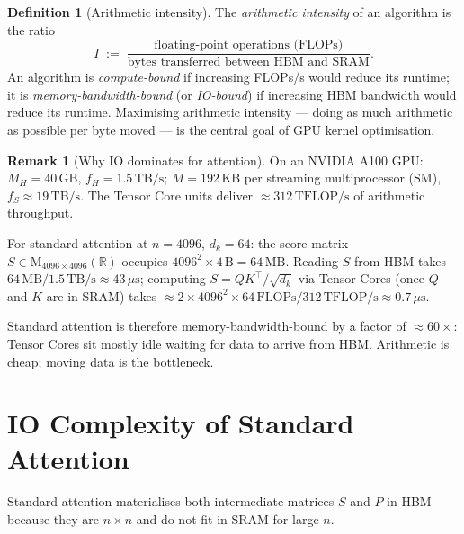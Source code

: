 \documentclass[11pt]{amsart}
\theoremstyle{plain}
\theoremstyle{definition}
\newtheorem{definition}[theorem]{Definition}
\newtheorem{remark}[theorem]{Remark}
\newcommand{\R}{\mathbb{R}}
\newcommand{\Mat}[2]{\mathrm{M}_{#1 \times #2}(\R)}
\begin{document}
\begin{definition}[Arithmetic intensity]
\label{def:arithmetic-intensity}
The \emph{arithmetic intensity} of an algorithm is the ratio
\[
    I \;:=\; \frac{\text{floating-point operations (FLOPs)}}{\text{bytes transferred between HBM and SRAM}}.
\]
An algorithm is \emph{compute-bound} if increasing FLOPs/s would reduce
its runtime; it is \emph{memory-bandwidth-bound} (or \emph{IO-bound}) if
increasing HBM bandwidth would reduce its runtime.  Maximising arithmetic
intensity --- doing as much arithmetic as possible per byte moved --- is
the central goal of GPU kernel optimisation.
\end{definition}

\begin{remark}[Why IO dominates for attention]
\label{rem:io-dominates}
On an NVIDIA A100 GPU: $M_H = 40\,\text{GB}$, $f_H = 1.5\,\text{TB/s}$;
$M = 192\,\text{KB}$ per streaming multiprocessor (SM),
$f_S \approx 19\,\text{TB/s}$.
The Tensor Core units deliver $\approx 312\,\text{TFLOP/s}$ of arithmetic
throughput.

For standard attention at $n = 4096$, $d_k = 64$: the score matrix
$S \in \Mat{4096}{4096}$ occupies $4096^2 \times 4\,\text{B} = 64\,\text{MB}$.
Reading $S$ from HBM takes $64\,\text{MB} / 1.5\,\text{TB/s} \approx 43\,\mu\text{s}$;
computing $S = QK^\top/\sqrt{d_k}$ via Tensor Cores (once $Q$ and $K$ are
in SRAM) takes $\approx 2 \times 4096^2 \times 64\,\text{FLOPs} /
312\,\text{TFLOP/s} \approx 0.7\,\mu\text{s}$.

Standard attention is therefore memory-bandwidth-bound by a factor of
$\approx 60\times$: Tensor Cores sit mostly idle waiting for data to
arrive from HBM.  Arithmetic is cheap; moving data is the bottleneck.
\end{remark}

\section{IO Complexity of Standard Attention}
\label{sec:standard-attention-io}

Standard attention materialises both intermediate matrices $S$ and $P$ in
HBM because they are $n \times n$ and do not fit in SRAM for large $n$.
\end{document}
